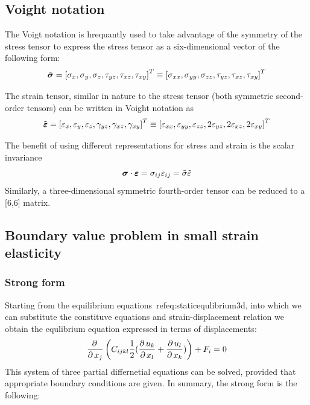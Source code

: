\subsection{Voight notation}

The Voigt notation is hrequantly used to take advantage of the symmetry of the stress tensor to express the stress tensor as a six-dimensional vector of the following form:
$$
\tilde{\mbox{\boldmath$\sigma$}}=
\left[
  \sigma_{x}, \sigma_y, \sigma_z, \tau_{yz}, \tau_{xz}, \tau_{xy}
  \right]^T \equiv
\left[
  \sigma_{xx}, \sigma_{yy}, \sigma_{zz}, \tau_{yz}, \tau_{xz}, \tau_{xy}
  \right]^T
$$

The strain tensor, similar in nature to the stress tensor (both symmetric second-order tensors) can be written in Voight notation as
$$
\tilde{\mbox{\boldmath$\varepsilon $}}=
\left[
  \varepsilon_{x}, \varepsilon_y, \varepsilon_z, \gamma_{yz}, \gamma_{xz}, \gamma_{xy}
  \right]^T \equiv
\left[
  \varepsilon_{xx}, \varepsilon_{yy}, \varepsilon_{zz}, 2\varepsilon_{yz}, 2\varepsilon_{xz}, 2\varepsilon_{xy}
  \right]^T
$$

The benefit of using different representations for stress and strain is the scalar invariance
$$
\mbox{\boldmath$\sigma$}\cdot\mbox{\boldmath$\varepsilon$}=\sigma_{ij}\varepsilon_{ij}=\tilde{\sigma} \tilde{\varepsilon}
$$
Similarly, a three-dimensional symmetric fourth-order tensor can be reduced to a [6,6] matrix.


\subsection {Boundary value problem in small strain elasticity}
\subsubsection{Strong form}

Starting from the equilibrium equations~ref{eq:staticequlibrium3d}, into which we can substitute the constituve equations and strain-displacement relation we obtain the equlibrium equation expressed in terms of displacements:
$$
\mbox{$\displaystyle\frac{\partial \,{}}{\partial \,{x_j}}$}\left({C_{ijkl} {1\over 2}(\mbox{$\displaystyle\frac{\partial \,{u_k}}{\partial \,{x_l}}$}+\mbox{$\displaystyle\frac{\partial \,{u_l}}{\partial \,{x_k}}$})}\right) + F_i = 0
$$
This system of three partial differnetial equations can be solved, provided that appropriate boundary conditions are given. In summary, the strong form is the following:\\
\begin{center}
\end{center}

